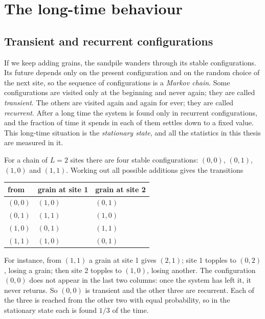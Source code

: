 \section{The long-time behaviour}
\label{sec:stationary}

\subsection{Transient and recurrent configurations}

If we keep adding grains, the sandpile wanders through its stable configurations. Its future depends only on the
present configuration and on the random choice of the next site, so the sequence of configurations is a
\emph{Markov chain}. Some configurations are visited only at the beginning and never again; they are called
\emph{transient}. The others are visited again and again for ever; they are called \emph{recurrent}. After a long
time the system is found only in recurrent configurations, and the fraction of time it spends in each of them
settles down to a fixed value. This long-time situation is the \emph{stationary state}, and all the statistics in
this thesis are measured in it.

\begin{example}
\label{ex:L2}
For a chain of $L=2$ sites there are four stable configurations: $(0,0)$, $(0,1)$, $(1,0)$ and $(1,1)$. Working out
all possible additions gives the transitions
\begin{center}
\begin{tabular}{lll}
\toprule
from & grain at site 1 & grain at site 2 \\
\midrule
$(0,0)$ & $(1,0)$ & $(0,1)$ \\
$(0,1)$ & $(1,1)$ & $(1,0)$ \\
$(1,0)$ & $(0,1)$ & $(1,1)$ \\
$(1,1)$ & $(1,0)$ & $(0,1)$ \\
\bottomrule
\end{tabular}
\end{center}
For instance, from $(1,1)$ a grain at site 1 gives $(2,1)$; site 1 topples to $(0,2)$, losing a grain; then site 2
topples to $(1,0)$, losing another. The configuration $(0,0)$ does not appear in the last two columns: once the system
has left it, it never returns. So $(0,0)$ is transient and the other three are recurrent. Each of the three is
reached from the other two with equal probability, so in the stationary state each is found $1/3$ of the time.
\end{example}

